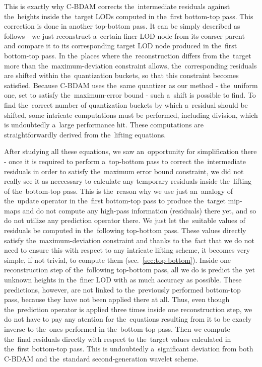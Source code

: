 This is exactly why C-BDAM corrects the~intermediate residuals against the~heights inside the~target LODs computed in the~first bottom-top pass. This correction is done in another top-bottom pass. It can be simply described as follows - we just reconstruct a~certain finer LOD node from its coarser parent and compare it to its corresponding target LOD node produced in the~first bottom-top pass. In the~places where the~reconstruction differs from the~target more than the~maximum-deviation constraint allows, the~corresponding residuals are shifted within the~quantization buckets, so that this constraint becomes satisfied. Because C-BDAM uses the~same quantizer as our method - the~uniform one, set to satisfy the~maximum-error bound - such a~shift is possible to find. To find the~correct number of quantization buckets by which a~residual should be shifted, some intricate computations must be performed, including division, which is undoubtedly a~large performance hit. These computations are straightforwardly derived from the~lifting equations.

After studying all these equations, we saw an~opportunity for simplification there - once it is required to perform a~top-bottom pass to correct the~intermediate residuals in order to satisfy the~maximum error bound constraint, we did not really see it as neccessary to calculate any temporary residuals inside the~lifting of the~bottom-top pass. This is the~reason why we use just an~analogy of the~update operator in the~first bottom-top pass to produce the~target mip-maps and do not compute any high-pass information (residuals) there yet, and so do not utilize any prediction operator there. We just let the~suitable values of residuals be computed in the~following top-bottom pass. These values directly satisfy the~maximum-deviation constraint and thanks to the~fact that we do not need to ensure this with respect to any intricate lifting scheme, it becomes very simple, if not trivial, to compute them (sec.~\ref{sec:top-bottom}). Inside one reconstruction step of the~following top-bottom pass, all we do is predict the~yet unknown heights in the~finer LOD with as much accuracy as possible. These predictions, however, are not linked to the~previously performed bottom-top pass, because they have not been applied there at all. Thus, even though the~prediction operator is applied three times inside one reconstruction step, we do not have to pay any atention for the~equations resulting from it to be exacly inverse to the~ones performed in the~bottom-top pass. Then we compute the~final residuals directly with respect to the~target values calculated in the~first bottom-top pass. This is undoubtedly a~significant deviation from both C-BDAM and the~standard second-generation wavelet scheme. 

